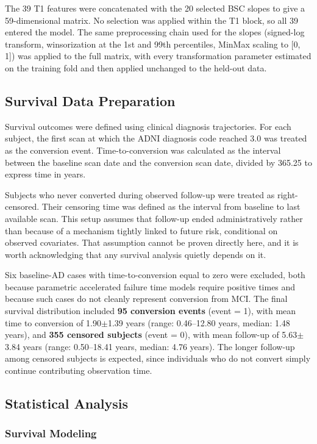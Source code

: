 \documentclass[blue]{ludusofficial}  %
\begin{document}
The 39 T1 features were concatenated with the 20 selected BSC slopes to give a 59-dimensional matrix. No selection was applied within the T1 block, so all 39 entered the model. The same preprocessing chain used for the slopes (signed-log transform, winsorization at the 1st and 99th percentiles, MinMax scaling to [0, 1]) was applied to the full matrix, with every transformation parameter estimated on the training fold and then applied unchanged to the held-out data.

\subsection{Survival Data Preparation}

Survival outcomes were defined using clinical diagnosis trajectories. For each subject, the first scan at which the ADNI diagnosis code reached 3.0 was treated as the conversion event. Time-to-conversion was calculated as the interval between the baseline scan date and the conversion scan date, divided by 365.25 to express time in years.

Subjects who never converted during observed follow-up were treated as right-censored. Their censoring time was defined as the interval from baseline to last available scan. This setup assumes that follow-up ended administratively rather than because of a mechanism tightly linked to future risk, conditional on observed covariates. That assumption cannot be proven directly here, and it is worth acknowledging that any survival analysis quietly depends on it.

Six baseline-AD cases with time-to-conversion equal to zero were excluded, both because parametric accelerated failure time models require positive times and because such cases do not cleanly represent conversion from MCI. The final survival distribution included \textbf{95 conversion events} (event = 1), with mean time to conversion of 1.90$\pm$1.39 years (range: 0.46--12.80 years, median: 1.48 years), and \textbf{355 censored subjects} (event = 0), with mean follow-up of 5.63$\pm$3.84 years (range: 0.50--18.41 years, median: 4.76 years). The longer follow-up among censored subjects is expected, since individuals who do not convert simply continue contributing observation time.

\subsection{Statistical Analysis}

\subsubsection{Survival Modeling}
\end{document}
